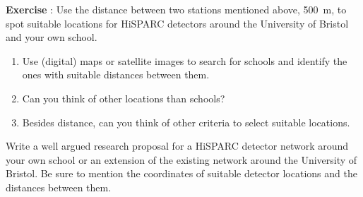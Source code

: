 \begin{shaded}
\textbf{Exercise \theExercise {}} : Use the distance between two stations mentioned above, 500~m, to spot suitable locations for HiSPARC detectors around the University of Bristol and your own school.
\begin{enumerate}[-]
\item Use (digital) maps or satellite images to search for schools and identify the ones with suitable distances between them.
\item Can you think of other locations than schools?
\item Besides distance, can you think of other criteria to select suitable locations.
\end{enumerate}
Write a well argued research proposal for a HiSPARC detector network around your own school or an extension of the existing network around the University of Bristol. Be sure to mention the coordinates of suitable detector locations and the distances between them. 
\end{shaded}


